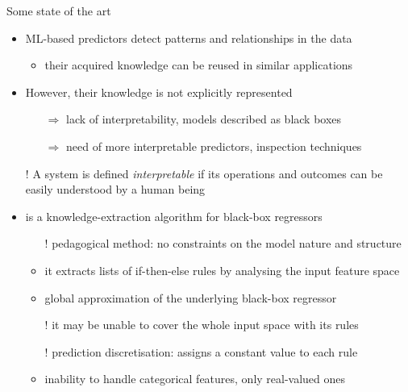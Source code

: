 \documentclass[presentation]{beamer}
\begin{document}
\begin{frame}{Some state of the art}
	
    \begin{itemize}
    	\item ML-based predictors detect patterns and relationships in the data
    	\begin{itemize}
    		\item their acquired knowledge can be reused in similar applications
    	\end{itemize}
    
    	\vfill
    
    	\item However, their knowledge is not explicitly represented
    	\begin{itemize}
    		\item[$\Rightarrow$] lack of interpretability, models described as black boxes
    		\item[$\Rightarrow$] need of more interpretable predictors, inspection techniques    		
    	\end{itemize}
    
    	\vfill
    	
    	\item[!] \alert{A system is defined \emph{interpretable} if its operations and outcomes can be easily understood by a human being}
    	
    	\vfill
    	
    	\item \iter{} is a knowledge-extraction algorithm for black-box regressors
    	\begin{itemize}
    		\item[!] pedagogical method: no constraints on the model nature and structure
    		\item it extracts lists of if-then-else rules by analysing the input feature space 
    		\item global approximation of the underlying black-box regressor 	
    		\item[!] it may be unable to cover the whole input space with its rules   
    		\item[!] prediction discretisation: \iter assigns a constant value to each rule
    		\item inability to handle categorical features, only real-valued ones
    	\end{itemize}
    \end{itemize}

\end{frame}
\end{document}
